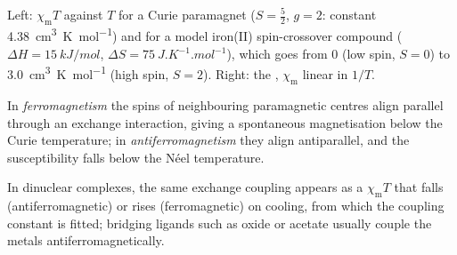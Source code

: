 \begin{omfigure}

{\small Left: $\chi_{\mathrm m}T$ against $T$ for a Curie paramagnet ($S = \frac52$, $g = 2$: constant
\qty{4.38}{cm^3.K.mol^{-1}}) and for a model iron(II) spin-crossover compound ($\Delta H =
\qty{15}{kJ/mol}$, $\Delta S = \qty{75}{J.K^{-1}.mol^{-1}}$), which goes from 0 (low spin, $S = 0$) to
\qty{3.0}{cm^3.K.mol^{-1}} (high spin, $S = 2$). Right: the , $\chi_{\mathrm m}$ linear in $1/T$.}
\end{omfigure}

\begin{definition}\label{def:b3:complex-spectra-magnetism:cooperative}
In \emph{ferromagnetism} the spins of neighbouring
paramagnetic centres align parallel through an exchange interaction, giving a
spontaneous magnetisation below the Curie temperature; in
\emph{antiferromagnetism} they align antiparallel, and
the susceptibility falls below the Néel temperature.
\end{definition}

In dinuclear complexes, the same exchange coupling appears as a $\chi_{\mathrm m}T$ that falls
(antiferromagnetic) or rises (ferromagnetic) on cooling, from which the coupling
constant is fitted; bridging ligands such as oxide or acetate usually couple the
metals antiferromagnetically.

